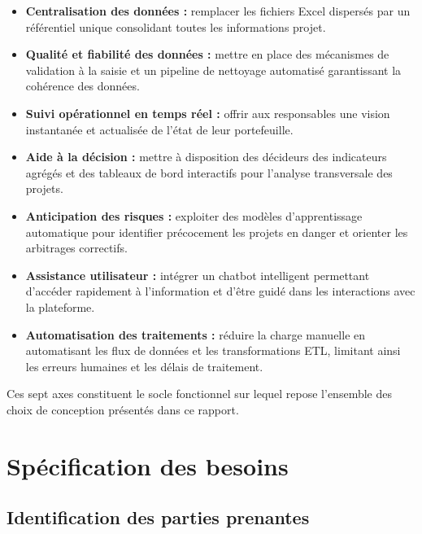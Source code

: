 \begin{itemize}
    \item \textbf{Centralisation des données :} remplacer les fichiers
    Excel dispersés par un référentiel unique consolidant toutes
    les informations projet.

    \item \textbf{Qualité et fiabilité des données :} mettre en place
    des mécanismes de validation à la saisie et un pipeline de
    nettoyage automatisé garantissant la cohérence des données.

    \item \textbf{Suivi opérationnel en temps réel :} offrir aux
    responsables une vision instantanée et actualisée de l'état
    de leur portefeuille.

    \item \textbf{Aide à la décision :} mettre à disposition des
    décideurs des indicateurs agrégés et des tableaux de bord
    interactifs pour l'analyse transversale des projets.

    \item \textbf{Anticipation des risques :} exploiter des modèles
    d'apprentissage automatique pour identifier précocement les
    projets en danger et orienter les arbitrages correctifs.

    \item \textbf{Assistance utilisateur :} intégrer un chatbot
    intelligent permettant d'accéder rapidement à l'information
    et d'être guidé dans les interactions avec la plateforme.

    \item \textbf{Automatisation des traitements :} réduire la charge
    manuelle en automatisant les flux de données et les transformations
    ETL, limitant ainsi les erreurs humaines et les délais de
    traitement.
\end{itemize}

Ces sept axes constituent le socle fonctionnel sur lequel repose
l'ensemble des choix de conception présentés dans ce rapport.

\section{Spécification des besoins}

\subsection{Identification des parties prenantes}


